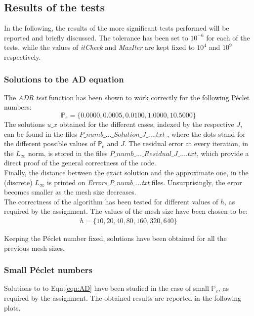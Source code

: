 \documentclass[11pt]{article}
\theoremstyle{theorem}
\theoremstyle{definition}
\begin{document}
\subsection{Results of the tests}
In the following, the results of the more significant tests performed will be reported and briefly discussed. The tolerance has been set to $10^{-6}$ for each of the tests, while the values of \emph{itCheck} and \emph{MaxIter} are kept fixed to $10^4$ and $10^9$ respectively.\\

\subsubsection{Solutions to the AD equation}
The \emph{ADR$\_$test} function has been shown to work correctly for the following  P\'{e}clet numbers:
$$\mathbb{P}_e=\lbrace 0.0000, 0.0005, 0.0100, 1.0000, 10.5000 \rbrace$$
The solutions $u\_x$ obtained for the different cases, indexed by the respective $J$, can be found in the files $P\_numb\_...\_Solution\_J\_....txt$ , where the dots stand for the different possible values of $\mathbb{P}_e$ and $J$. The residual error at every iteration, in the $L_\infty$ norm, is stored in the files $P\_numb\_...\_Residual\_J\_....txt$, which provide a direct proof of the general correctness of the code.\\
Finally, the distance between the exact solution and the approximate one, in the (discrete) $L_\infty$ is printed on \emph{Errors$\_$P$\_$numb$\_$...txt} files. Unsurprisingly, the error becomes smaller as the mesh size decreases.\\
The correctness of the algorithm has been tested for different values of $h$, as required by the assignment. The values of the mesh size have been chosen to be:
\begin{align}
	\label{eqn:h-choice}
	h=\lbrace10, 20, 40, 80, 160, 320, 640\rbrace
\end{align}

Keeping the P\'{e}clet number fixed, solutions have been obtained for all the previous mesh sizes.\\ 


\subsubsection{Small P\'{e}clet numbers}
Solutions to to Eqn.\eqref{eqn:AD} have been studied in the case of small $\mathbb{P}_e$, as required by the assignment. The obtained results are reported in the following plots.
\end{document}
